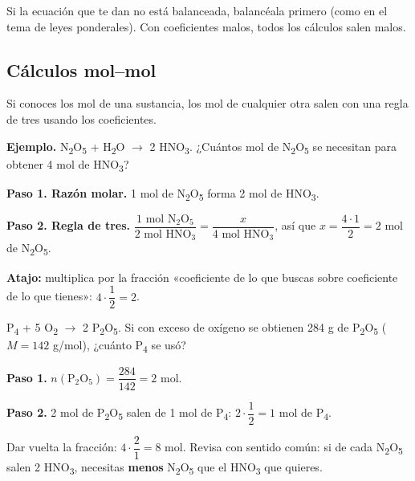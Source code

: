 \begin{clave} Si la ecuación que te dan no está balanceada, balancéala primero (como en el tema de leyes ponderales). Con coeficientes malos, todos los cálculos salen malos.\end{clave}
\subsection{Cálculos mol--mol}
Si conoces los mol de una sustancia, los mol de cualquier otra salen con una regla de tres usando los coeficientes.

 

\textbf{Ejemplo.} N\textsubscript{2}O\textsubscript{5} + H\textsubscript{2}O \ensuremath{\rightarrow} 2 HNO\textsubscript{3}. ¿Cuántos mol de N\textsubscript{2}O\textsubscript{5} se necesitan para obtener 4 mol de HNO\textsubscript{3}?

 

\textbf{Paso 1. Razón molar.} 1 mol de N\textsubscript{2}O\textsubscript{5} forma 2 mol de HNO\textsubscript{3}.

 

\textbf{Paso 2. Regla de tres.} $\dfrac{1 \text{ mol N}_2\text{O}_5}{2 \text{ mol HNO}_3} = \dfrac{x}{4 \text{ mol HNO}_3}$, así que $x = \dfrac{4\cdot 1}{2} = 2$ mol de N\textsubscript{2}O\textsubscript{5}.

 

\textbf{Atajo:} multiplica por la fracción «coeficiente de lo que buscas sobre coeficiente de lo que tienes»: $4\cdot\dfrac{1}{2} = 2$.

  
\begin{ejemplo} P\textsubscript{4} + 5 O\textsubscript{2} \ensuremath{\rightarrow} 2 P\textsubscript{2}O\textsubscript{5}. Si con exceso de oxígeno se obtienen 284 g de P\textsubscript{2}O\textsubscript{5} ($M = 142$ g/mol), ¿cuánto P\textsubscript{4} se usó?\par \textbf{Paso 1.} $n(\text{P}_2\text{O}_5) = \dfrac{284}{142} = 2$ mol.\par \textbf{Paso 2.} 2 mol de P\textsubscript{2}O\textsubscript{5} salen de 1 mol de P\textsubscript{4}: $2\cdot\dfrac{1}{2} = 1$ mol de P\textsubscript{4}.\end{ejemplo}
 
\begin{ojo} Dar vuelta la fracción: $4\cdot\dfrac{2}{1} = 8$ mol. Revisa con sentido común: si de cada N\textsubscript{2}O\textsubscript{5} salen 2 HNO\textsubscript{3}, necesitas \textbf{menos} N\textsubscript{2}O\textsubscript{5} que el HNO\textsubscript{3} que quieres.\end{ojo}
 
